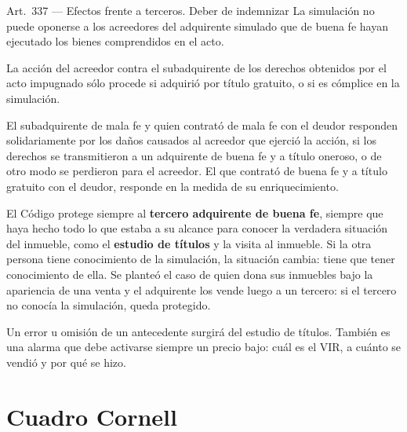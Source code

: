 \documentclass[12pt,oneside]{book}
\begin{document}
\begin{norma}{Art.~337 --- Efectos frente a terceros. Deber de indemnizar}
La simulaci\'on no puede oponerse a los acreedores del adquirente simulado que de buena fe hayan ejecutado los bienes comprendidos en el acto.

La acci\'on del acreedor contra el subadquirente de los derechos obtenidos por el acto impugnado s\'olo procede si adquiri\'o por t\'itulo gratuito, o si es c\'omplice en la simulaci\'on.

El subadquirente de mala fe y quien contrat\'o de mala fe con el deudor responden solidariamente por los da\~nos causados al acreedor que ejerci\'o la acci\'on, si los derechos se transmitieron a un adquirente de buena fe y a t\'itulo oneroso, o de otro modo se perdieron para el acreedor. El que contrat\'o de buena fe y a t\'itulo gratuito con el deudor, responde en la medida de su enriquecimiento.
\end{norma}

El C\'odigo protege siempre al \textbf{tercero adquirente de buena fe}, siempre que haya hecho todo lo que estaba a su alcance para conocer la verdadera situaci\'on del inmueble, como el \textbf{estudio de t\'itulos} y la visita al inmueble. Si la otra persona tiene conocimiento de la simulaci\'on, la situaci\'on cambia: tiene que tener conocimiento de ella. Se plante\'o el caso de quien dona sus inmuebles bajo la apariencia de una venta y el adquirente los vende luego a un tercero: si el tercero no conoc\'ia la simulaci\'on, queda protegido.

Un error u omisi\'on de un antecedente surgir\'a del estudio de t\'itulos. Tambi\'en es una alarma que debe activarse siempre un precio bajo: cu\'al es el VIR, a cu\'anto se vendi\'o y por qu\'e se hizo.


\section{Cuadro Cornell}
\end{document}
